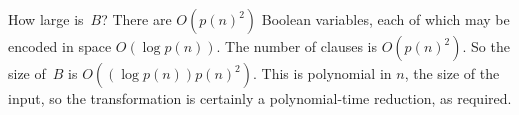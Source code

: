 How large is~$B$? There are $O(p(n)^2)$ Boolean variables, each of
which may be encoded in space $O(\log p(n))$. The number of clauses is
$O(p(n)^2)$. So the size of~$B$ is $O((\log p(n))p(n)^2)$. This is
polynomial in $n$, the size of the input, so the transformation is
certainly a polynomial-time reduction, as required.

